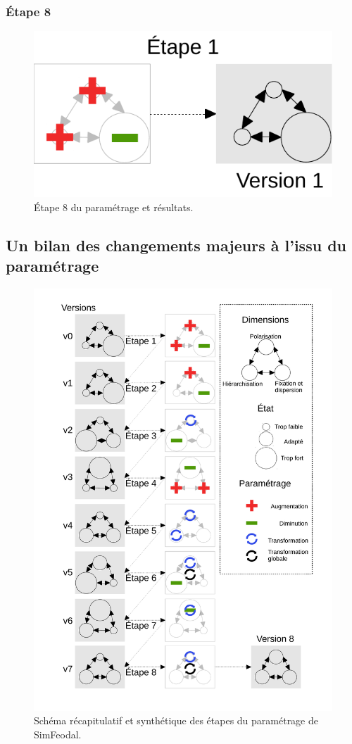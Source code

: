 	\subsubsection{Étape 8}
		\begin{figure}[H]
			\centering
			\includegraphics[width = \linewidth, page = 8]{img/schemas_etapes_individuelles.pdf}
			\caption{Étape 8 du paramétrage et résultats.}
		\end{figure}
	
	\pagebreak
	\subsection{Un bilan des changements majeurs à l'issu du paramétrage}
	
	\begin{figure}[H]
		\includegraphics[width = \linewidth, page = 1]{img/schema_etapes_complet.pdf}
		\caption{Schéma récapitulatif et synthétique des étapes du paramétrage de SimFeodal.}
		\label{fig:etapes-parametrage-simfeodal}
	\end{figure}
	